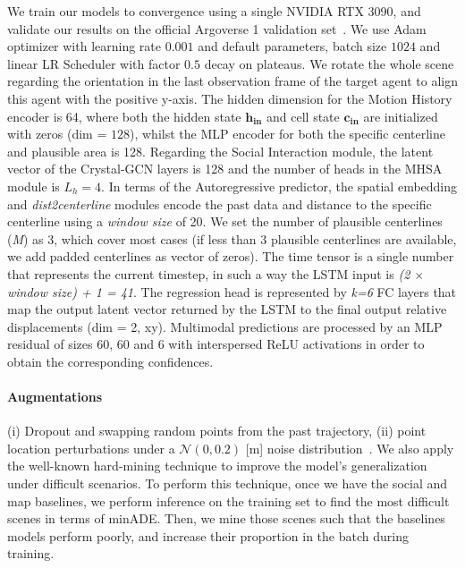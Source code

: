 We train our models to convergence using a single NVIDIA RTX 3090, and validate our results on the official Argoverse 1 validation set~\cite{chang2019argoverse}. We use Adam optimizer with learning rate $0.001$ and default parameters, batch size $1024$ and linear LR Scheduler with factor $0.5$ decay on plateaus. We rotate the whole scene regarding the orientation in the last observation frame of the target agent to align this agent with the positive y-axis. The hidden dimension for the Motion History encoder is 64, where both the hidden state $\mathbf{h_{in}}$ and cell state $\mathbf{c_{in}}$ are initialized with zeros (dim = $128$), whilst the MLP encoder for both the specific centerline and plausible area is 128. Regarding the Social Interaction module, the latent vector of the Crystal-GCN layers is 128 and the number of heads in the MHSA module is $L_h = 4$. In terms of the Autoregressive predictor, the spatial embedding and \textit{dist2centerline} modules encode the past data and distance to the specific centerline using a \textit{window size} of 20. We set the number of plausible centerlines (\textit{M}) as 3, which cover most cases (if less than 3 plausible centerlines are available, we add padded centerlines as vector of zeros). The time tensor is a single number that represents the current timestep, in such a way the LSTM input is \textit{(2 $\times$ window size) + 1 = 41}. The regression head is represented by \textit{k=6} FC layers that map the output latent vector returned by the LSTM to the final output relative displacements (dim = 2, xy). Multimodal predictions are processed by an MLP residual of sizes 60, 60 and 6 with interspersed ReLU activations in order to obtain the corresponding confidences.

\paragraph{Augmentations} 

(i) Dropout and swapping random points from the past trajectory, (ii) point location perturbations under a $\mathcal{N}(0, 0.2)$ [m] noise distribution~\cite{ye2021tpcn}. We also apply the well-known hard-mining technique to improve the model's generalization under difficult scenarios. To perform this technique, once we have the social and map baselines, we perform inference on the training set to find the most difficult scenes in terms of minADE. Then, we mine those scenes such that the baselines models perform poorly, and increase their proportion in the batch during training.

